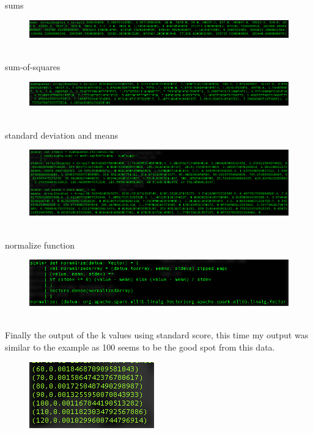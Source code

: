 \documentclass[10pt]{article}
\begin{document}
\pagebreak
sums
\begin{figure}[!h]
\includegraphics[scale=0.37]{sum.png}
\centering
\end{figure}\\
sum-of-squares
\begin{figure}[!h]
\includegraphics[scale=0.37]{sumSquares.png}
\centering
\end{figure}\\
standard deviation and means
\begin{figure}[!h]
\includegraphics[scale=0.37]{stDev_and_means.png}
\centering
\end{figure}\\
normalize function
\begin{figure}[!h]
\includegraphics[scale=0.37]{normalizeFunction.png}
\centering
\end{figure}\\
\indent Finally the output of the k values using standard score, this time my output was similar to the example as 100 seems to be the good spot from this data.
\begin{figure}[!h]
\includegraphics[scale=0.37]{standardScore.png}
\centering
\end{figure}\\
\end{document}
